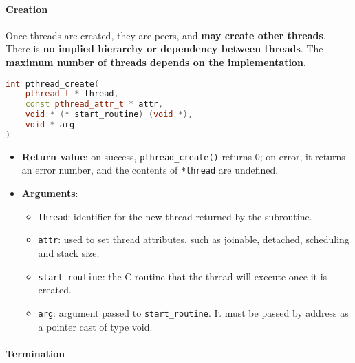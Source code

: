 \longline

\paragraph{Creation}\label{paragraph: Creation}

Once threads are created, they are peers, and \textbf{may create other threads}. There is \textbf{no implied hierarchy or dependency between threads}. The \textbf{maximum number of threads depends on the implementation}.
\begin{pthreadbox}
    \begin{lstlisting}[language=c++]
int pthread_create(
    pthread_t * thread,
    const pthread_attr_t * attr,
    void * (* start_routine) (void *),
    void * arg
)\end{lstlisting}
\end{pthreadbox}

\noindent
\begin{itemize}
    \item \textbf{Return value}: on success, \texttt{pthread\_create()} returns 0; on error, it returns an error number, and the contents of \texttt{*thread} are undefined.
    \item \textbf{Arguments}:
    \begin{itemize}
        \item \texttt{thread}: identifier for the new thread returned by the subroutine.
        \item \texttt{attr}: used to set thread attributes, such as joinable, detached, scheduling and stack size.
        \item \texttt{start\_routine}: the C routine that the thread will execute once it is created.
        \item \texttt{arg}: argument passed to \texttt{start\_routine}. It must be passed by address as a pointer cast of type void.
    \end{itemize}
\end{itemize}

\longline

\paragraph{Termination}\label{paragraph: Termination}

